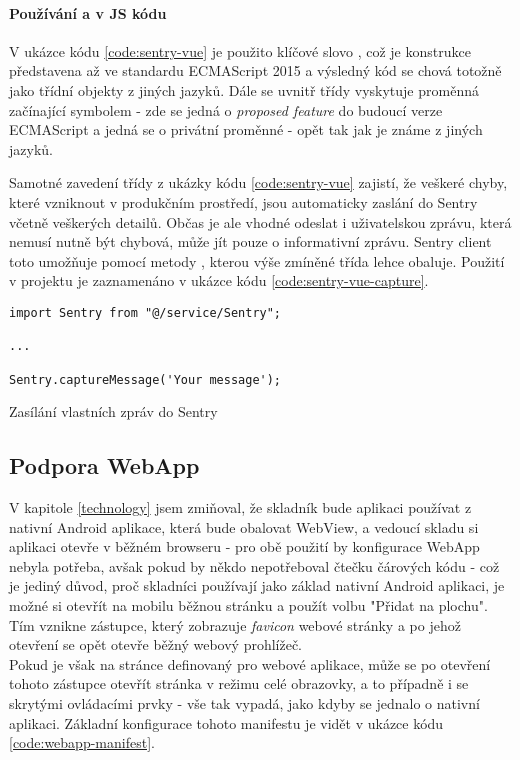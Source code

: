 \paragraph{Používání  a \code{\#} v JS kódu} V ukázce kódu \ref{code:sentry-vue} je použito klíčové slovo , což je konstrukce představena až ve standardu ECMAScript 2015 \cite{js-class} a výsledný kód se chová totožně jako třídní objekty z jiných jazyků. Dále se uvnitř třídy vyskytuje proměnná začínající symbolem \code{\#} - zde se jedná o \emph{proposed feature} \cite{js-proposed-private} do budoucí verze ECMAScript a jedná se o privátní proměnné - opět tak jak je známe z jiných jazyků.

Samotné zavedení třídy z ukázky kódu \ref{code:sentry-vue} zajistí, že veškeré chyby, které vzniknout v produkčním prostředí, jsou automaticky zaslání do Sentry včetně veškerých detailů. Občas je ale vhodné odeslat i uživatelskou zprávu, která nemusí nutně být chybová, může jít pouze o informativní zprávu. Sentry client toto umožňuje pomocí metody , kterou výše zmíněné třída lehce obaluje. Použití v projektu je zaznamenáno v ukázce kódu \ref{code:sentry-vue-capture}.

\begin{listing}[H]
\begin{verbatim}
import Sentry from "@/service/Sentry";

...

Sentry.captureMessage('Your message');
\end{verbatim}
\caption{Zasílání vlastních zpráv do Sentry} \label{code:sentry-vue-capture}
\end{listing}


\subsection{Podpora WebApp}

V kapitole \ref{technology} jsem zmiňoval, že skladník bude aplikaci používat z nativní Android aplikace, která bude obalovat WebView, a vedoucí skladu si aplikaci otevře v běžném browseru - pro obě použití by konfigurace WebApp nebyla potřeba, avšak pokud by někdo nepotřeboval čtečku čárových kódu - což je jediný důvod, proč skladníci používají jako základ nativní Android aplikaci, je možné si otevřít na mobilu běžnou stránku a použít volbu "Přidat na plochu". Tím vznikne zástupce, který zobrazuje \emph{favicon} webové stránky a po jehož otevření se opět otevře běžný webový prohlížeč.\\
Pokud je však na stránce definovaný  pro webové aplikace, může se po otevření tohoto zástupce otevřít stránka v režimu celé obrazovky, a to případně i se skrytými ovládacími prvky - vše tak vypadá, jako kdyby se jednalo o nativní aplikaci. Základní konfigurace tohoto manifestu je vidět v ukázce kódu \ref{code:webapp-manifest}.

